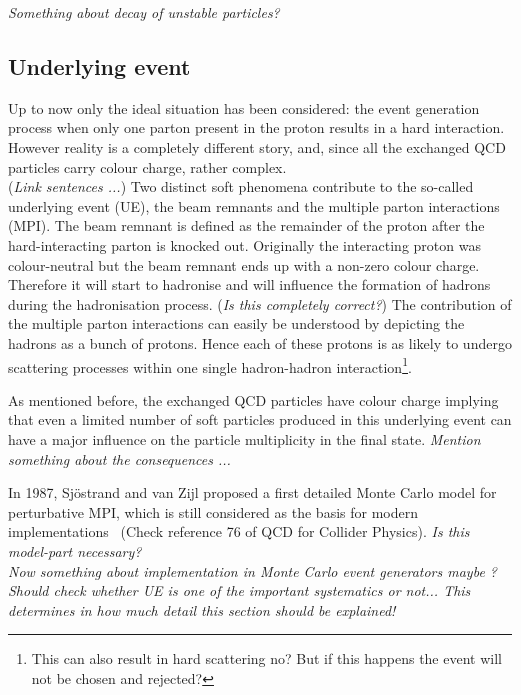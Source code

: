 \textit{Something about decay of unstable particles?}

\subsection{Underlying event}%
Up to now only the ideal situation has been considered: the event generation process when only one parton present in the proton results in a hard interaction. However reality is a completely different story, and, since all the exchanged QCD particles carry colour charge, rather complex.\\
(\textit{Link sentences ...}) Two distinct soft phenomena contribute to the so-called underlying event (UE), the beam remnants and the multiple parton interactions (MPI). The beam remnant is defined as the remainder of the proton after the hard-interacting parton is knocked out. Originally the interacting proton was colour-neutral but the beam remnant ends up with a non-zero colour charge. Therefore it will start to hadronise and will influence the formation of hadrons during the hadronisation process. (\textit{Is this completely correct?}) The contribution of the multiple parton interactions can easily be understood by depicting the hadrons as a bunch of protons. Hence each of these protons is as likely to undergo scattering processes within one single hadron-hadron interaction\footnote{This can also result in hard scattering no? But if this happens the event will not be chosen and rejected?}.

As mentioned before, the exchanged QCD particles have colour charge implying that even a limited number of soft particles produced in this underlying event can have a major influence on the particle multiplicity in the final state. 
\textit{Mention something about the consequences ...}

In 1987, Sj\"ostrand and van Zijl proposed a first detailed Monte Carlo model for perturbative MPI, which is still considered as the basis for modern implementations~\cite{SjostrandAndZijl} (Check reference 76 of QCD for Collider Physics). \textit{Is this model-part necessary?}\\
\textit{Now something about implementation in Monte Carlo event generators maybe ?}\\

\textit{Should check whether UE is one of the important systematics or not... This determines in how much detail this section should be explained!}

